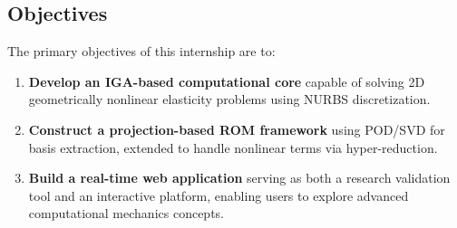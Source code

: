 \subsection{Objectives}
The primary objectives of this internship are to:
\begin{enumerate}
    \item \textbf{Develop an IGA-based computational core} capable of solving 2D geometrically nonlinear elasticity problems using NURBS discretization.
    \item \textbf{Construct a projection-based ROM framework} using POD/SVD for basis extraction, extended to handle nonlinear terms via hyper-reduction.
    \item \textbf{Build a real-time web application} serving as both a research validation tool and an interactive platform, enabling users to explore advanced computational mechanics concepts.
\end{enumerate}